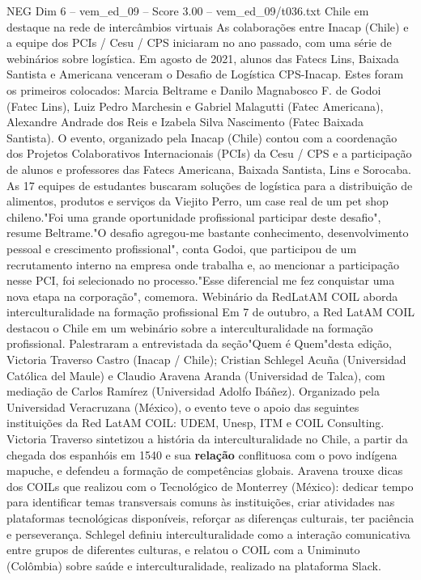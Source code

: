 \begin{textsample}{NEG Dim 6 – vem\_ed\_09 – Score 3.00 – vem\_ed\_09/t036.txt}  \label{ex:f6_neg_029}
Chile em destaque na rede de intercâmbios virtuais As colaborações entre Inacap (Chile) e a equipe dos PCIs / Cesu / CPS iniciaram no ano passado, com uma série de webinários sobre logística.
Em agosto de 2021, alunos das Fatecs Lins, Baixada Santista e Americana venceram o Desafio de Logística CPS-Inacap.
Estes foram os primeiros colocados: Marcia Beltrame e Danilo Magnabosco F. de Godoi (Fatec Lins), Luiz Pedro Marchesin e Gabriel Malagutti (Fatec Americana), Alexandre Andrade dos Reis e Izabela Silva Nascimento (Fatec Baixada Santista).
O evento, organizado pela Inacap (Chile) contou com a coordenação dos Projetos Colaborativos Internacionais (PCIs) da Cesu / CPS e a participação de alunos e professores das Fatecs Americana, Baixada Santista, Lins e Sorocaba.
As 17 equipes de estudantes buscaram soluções de logística para a distribuição de alimentos, produtos e serviços da Viejito Perro, um case real de um pet shop chileno."Foi uma grande oportunidade profissional participar deste desafio", resume Beltrame."O desafio agregou-me bastante conhecimento, desenvolvimento pessoal e crescimento profissional", conta Godoi, que participou de um recrutamento interno na empresa onde trabalha e, ao mencionar a participação nesse PCI, foi selecionado no processo."Esse diferencial me fez conquistar uma nova etapa na corporação", comemora.
Webinário da RedLatAM COIL aborda interculturalidade na formação profissional Em 7 de outubro, a Red LatAM COIL destacou o Chile em um webinário sobre a interculturalidade na formação profissional.
Palestraram a entrevistada da seção"Quem é Quem"desta edição, Victoria Traverso Castro (Inacap / Chile); Cristian Schlegel Acuña (Universidad Católica del Maule) e Claudio Aravena Aranda (Universidad de Talca), com mediação de Carlos Ramírez (Universidad Adolfo Ibáñez).
Organizado pela Universidad Veracruzana (México), o evento teve o apoio das seguintes instituições da Red LatAM COIL: UDEM, Unesp, ITM e COIL Consulting.
Victoria Traverso sintetizou a história da interculturalidade no Chile, a partir da chegada dos espanhóis em 1540 e sua \textbf{relação} conflituosa com o povo indígena mapuche, e defendeu a formação de competências globais.
Aravena trouxe dicas dos COILs que realizou com o Tecnológico de Monterrey (México): dedicar tempo para identificar temas transversais comuns às instituições, criar atividades nas plataformas tecnológicas disponíveis, reforçar as diferenças culturais, ter paciência e perseverança.
Schlegel definiu interculturalidade como a interação comunicativa entre grupos de diferentes culturas, e relatou o COIL com a Uniminuto (Colômbia) sobre saúde e interculturalidade, realizado na plataforma Slack.

\end{textsample}
